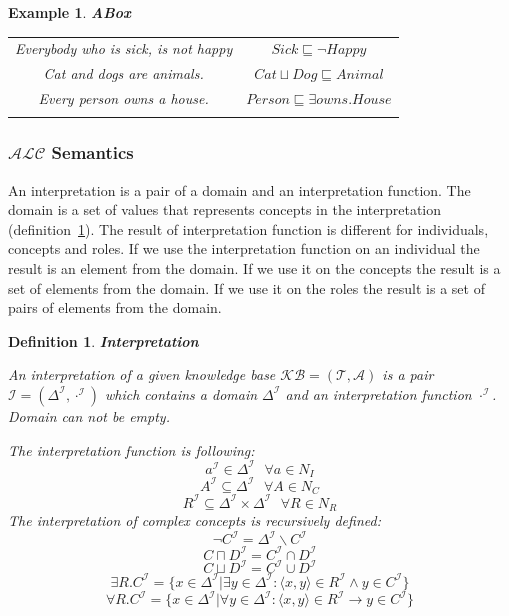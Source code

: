 \documentclass[12pt,a4paper]{article}
\newtheorem{definition}{Definition}[subsection]
\newtheorem{example}{Example}[subsection]
\begin{document}
\begin{example}{\textbf{ABox}}
	\label{example:sentences}
	
	\begin{table}[H]
		\centering
		\begin{tabular}{c c}
			Everybody who is sick, is not happy & $Sick \sqsubseteq \neg Happy$ \\ \addlinespace[0.5cm]
			Cat and dogs are animals. & $Cat \sqcup Dog \sqsubseteq Animal$ \\ \addlinespace[0.5cm]
			Every person owns a house. & $Person \sqsubseteq \exists owns.House$ \\	\addlinespace[0.5cm]
		\end{tabular}		
	\end{table}
\end{example}

\subsubsection{$\mathcal{ALC}$ Semantics}
An interpretation is a pair of a domain and an interpretation function. The domain is a set of values that represents concepts in the interpretation (definition~\ref{def:interpretation}). The result of interpretation function is different for individuals, concepts and roles. If we use the interpretation function on an individual the result is an element from the domain. If we use it on the concepts the result is a set of elements from the domain. If we use it on the roles the result is a set of pairs of elements from the domain.

\newpage
\begin{definition}{\textbf{Interpretation}}
	\label{def:interpretation}

	An interpretation of a given knowledge base $\mathcal{KB} = (\mathcal{T}, \mathcal{A})$ is a pair $\mathcal{I} = (\Delta^{\mathcal{I}}, \cdot ^{\mathcal{I}})$ which contains a domain $\Delta^{\mathcal{I}}$ and an interpretation function $\cdot ^{\mathcal{I}}$.	
	Domain can not be empty.
		
	The interpretation function is following:
	\[ a^{\mathcal{I}} \in \Delta^{\mathcal{I}} \text{ } \forall a \in N_{I} \]
	\[ A^{\mathcal{I}} \subseteq \Delta^{\mathcal{I}} \text{ } \forall A \in N_{C} \]
	\[ R^{\mathcal{I}} \subseteq \Delta^{\mathcal{I}} \times \Delta^{\mathcal{I}} \text{ } \forall R \in N_{R} \]
	The interpretation of complex concepts is recursively defined:
	\[ \neg C^{\mathcal{I}} = \Delta^{\mathcal{I}} \backslash C^{\mathcal{I}} \]
	\[ C \sqcap D^{\mathcal{I}} = C^{\mathcal{I}} \cap D^{\mathcal{I}} \]
	\[ C \sqcup D^{\mathcal{I}} = C^{\mathcal{I}} \cup D^{\mathcal{I}} \]
	\[ \exists R.C^{\mathcal{I}} = \{ x \in \Delta^{\mathcal{I}} | \exists y \in \Delta^{\mathcal{I}} : \langle x,y \rangle \in R^{\mathcal{I}} \land y \in C^{\mathcal{I}} \} \]
	\[ \forall R.C^{\mathcal{I}} = \{ x \in \Delta^{\mathcal{I}} | \forall y \in \Delta^{\mathcal{I}} : \langle x,y \rangle \in R^{\mathcal{I}} \rightarrow y \in C^{\mathcal{I}} \} \]
\end{definition}
\end{document}
